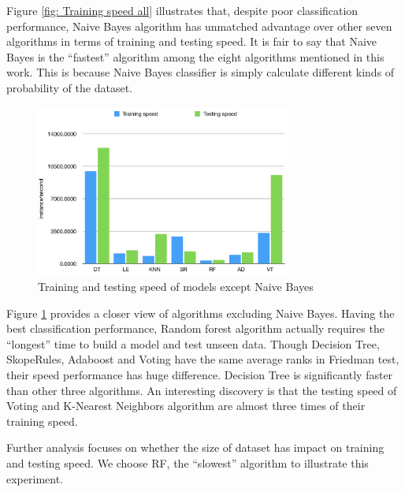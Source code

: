 Figure \ref{fig: Training speed all} illustrates that, despite poor classification performance, Naive Bayes algorithm has unmatched advantage over other seven algorithms in terms of training and testing speed. It is fair to say that Naive Bayes is the “fastest” algorithm among the eight algorithms mentioned in this work. This is because Naive Bayes classifier is simply calculate different kinds of probability of the dataset. 

\begin{figure}
  \includegraphics[width=0.75\textwidth]
  {training speed seven.png}
\caption{Training and testing speed of models except Naive Bayes}
\label{fig: Training speed seven}       %
\end{figure}

Figure \ref{fig: Training speed seven} provides a closer view of algorithms excluding Naive Bayes. Having the best classification performance, Random forest algorithm actually requires the “longest” time to build a model and test unseen data. Though Decision Tree, SkopeRules, Adaboost and Voting have the same average ranks in Friedman test, their speed performance has huge difference. Decision Tree is significantly faster than other three algorithms. An interesting discovery is that the testing speed of Voting and K-Nearest Neighbors algorithm are almost three times of their training speed.

Further analysis focuses on whether the size of dataset has impact on training and testing speed. We choose RF, the “slowest” algorithm to illustrate this experiment.

